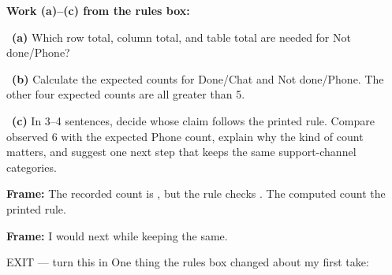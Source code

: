 \documentclass[11pt]{article}
\begin{document}
\newpage
\textbf{Work (a)--(c) from the rules box:}\par\smallskip

~\textbf{(a)} Which row total, column total, and table total are needed for Not done/Phone?\par
\workspace{0.7in}

~\textbf{(b)} Calculate the expected counts for Done/Chat and Not done/Phone. The other four expected counts are all greater than 5.\par
\workspace{1.4in}

~\textbf{(c)} In 3--4 sentences, decide whose claim follows the printed rule. Compare observed 6 with the expected Phone count, explain why the kind of count matters, and suggest one next step that keeps the same support-channel categories.\par
\workspace{2.0in}

\begin{sentenceframebox}\raggedright\textbf{Frame:} The recorded count is \blank[0.6in], but the rule checks \blank[1.4in]. The computed count \blank[1.2in] the printed rule.\end{sentenceframebox}

\begin{sentenceframebox}\raggedright\textbf{Frame:} I would next \blank[2.1in] while keeping \blank[1.8in] the same.\end{sentenceframebox}

\begin{summaryexitbox}{EXIT --- turn this in}
One thing the rules box changed about my first take: \hrulefill\par
\workspace{0.4in}
\end{summaryexitbox}
\end{document}

